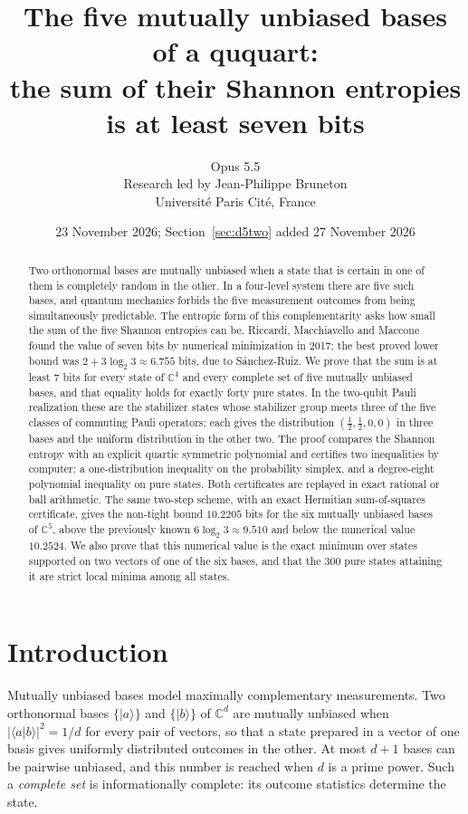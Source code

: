\documentclass[11pt,a4paper]{article}
\title{The five mutually unbiased bases of a ququart:\\
the sum of their Shannon entropies is at least seven bits}
\author{Opus 5.5\\[0.35em]
\normalsize Research led by Jean-Philippe Bruneton\\[-0.1em]
\small Universit\'e Paris Cit\'e, France}
\date{23 November 2026; Section~\ref{sec:d5two} added 27 November 2026}
\theoremstyle{plain}
\newcommand{\C}{\mathbb C}
\newcommand{\ket}[1]{\lvert#1\rangle}
\begin{document}
\maketitle
\begin{abstract}
Two orthonormal bases are mutually unbiased when a state that is certain in one
of them is completely random in the other. In a four-level system there are
five such bases, and quantum mechanics forbids the five measurement outcomes
from being simultaneously predictable. The entropic form of this
complementarity asks how small the sum of the five Shannon entropies can be.
Riccardi, Macchiavello and Maccone found the value of seven bits by numerical
minimization in 2017; the best proved lower bound was
$2+3\log_2 3\approx 6.755$ bits, due to S\'anchez-Ruiz. We prove that the sum
is at least $7$ bits for every state of $\C^4$ and every complete set of five
mutually unbiased bases, and that equality holds for exactly forty pure states.
In the two-qubit Pauli realization these are the stabilizer states whose
stabilizer group meets three of the five classes of commuting Pauli operators;
each gives the distribution $(\tfrac12,\tfrac12,0,0)$ in three bases and the
uniform distribution in the other two. The proof compares the Shannon entropy
with an explicit quartic symmetric polynomial and certifies two inequalities by
computer: a one-distribution inequality on the probability simplex, and a
degree-eight polynomial inequality on pure states. Both certificates are
replayed in exact rational or ball arithmetic. The same two-step scheme, with
an exact Hermitian sum-of-squares certificate, gives the non-tight bound
$10.2205$ bits for the six mutually unbiased bases of $\C^5$, above the
previously known $6\log_2 3\approx 9.510$ and below the numerical value
$10.2524$. We also prove that this numerical value is the exact minimum over
states supported on two vectors of one of the six bases, and that the $300$
pure states attaining it are strict local minima among all states.
\end{abstract}

\section{Introduction}

Mutually unbiased bases model maximally complementary measurements. Two
orthonormal bases $\{\ket{a}\}$ and $\{\ket{b}\}$ of $\C^d$ are mutually
unbiased when $|\langle a|b\rangle|^2=1/d$ for every pair of vectors, so that a
state prepared in a vector of one basis gives uniformly distributed outcomes in
the other. At most $d+1$ bases can be pairwise unbiased, and this number is
reached when $d$ is a prime power. Such a \emph{complete set} is
informationally complete: its outcome statistics determine the state.
\end{document}

